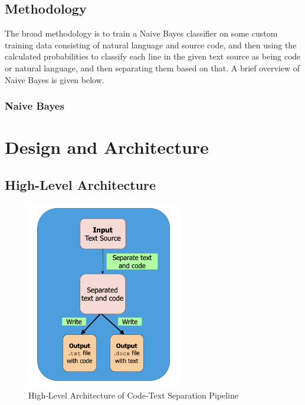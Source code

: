 \documentclass[12pt]{scrreprt}
\begin{document}

\section{Methodology}

The broad methodology is to train a Naive Bayes classifier on some custom training data consisting of natural language and source code, and then using the calculated probabilities to classify each line in the given text source as being code or natural language, and then separating them based on that. A brief overview of Naive Bayes is given below.
\subsection{Naive Bayes}







\chapter{Design and Architecture}





\section{High-Level Architecture}

\begin{figure}[h]
    \centering
    \includegraphics[width=0.6\textwidth]{figures/NB-high-arch.png}
    \caption{High-Level Architecture of Code-Text Separation Pipeline}
    \label{fig:high-level-arch}
\end{figure}
\end{document}
